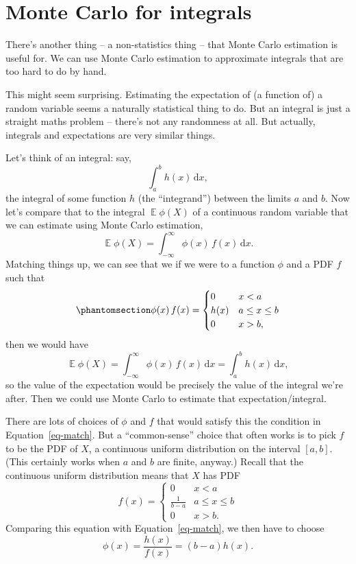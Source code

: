 \documentclass[
  letterpaper,
  DIV=11,
  numbers=noendperiod]{scrreprt}
\newcommand{\Exg}{\operatorname{\mathbb{E}}}
\theoremstyle{plain}
\theoremstyle{definition}
\theoremstyle{definition}
\theoremstyle{remark}
\begin{document}
\section{Monte Carlo for integrals}\label{monte-carlo-for-integrals}

There's another thing -- a non-statistics thing -- that Monte Carlo
estimation is useful for. We can use Monte Carlo estimation to
approximate integrals that are too hard to do by hand.

This might seem surprising. Estimating the expectation of (a function
of) a random variable seems a naturally statistical thing to do. But an
integral is just a straight maths problem -- there's not any randomness
at all. But actually, integrals and expectations are very similar
things.

Let's think of an integral: say, \[ \int_a^b h(x) \,\mathrm{d}x ,\] the
integral of some function \(h\) (the ``integrand'') between the limits
\(a\) and \(b\). Now let's compare that to the integral \(\Exg \phi(X)\)
of a continuous random variable that we can estimate using Monte Carlo
estimation,
\[ \Exg \phi(X) = \int_{-\infty}^\infty \phi(x)\,f(x)\, \mathrm{d} x. \]
Matching things up, we can see that we if we were to a function \(\phi\)
and a PDF \(f\) such that
\begin{equation}\phantomsection\label{eq-match}{ \phi(x)\,f(x) = \begin{cases} 0 & x < a \\ h(x) & a \leq x \leq b \\ 0 & x > b , \end{cases} }\end{equation}
then we would have
\[ \Exg \phi(X) = \int_{-\infty}^\infty \phi(x)\,f(x)\, \mathrm{d} x = \int_a^b h(x) \,\mathrm{d}x, \]
so the value of the expectation would be precisely the value of the
integral we're after. Then we could use Monte Carlo to estimate that
expectation/integral.

There are lots of choices of \(\phi\) and \(f\) that would satisfy this
the condition in Equation~\ref{eq-match}. But a ``common-sense'' choice
that often works is to pick \(f\) to be the PDF of \(X\), a continuous
uniform distribution on the interval \([a,b]\). (This certainly works
when \(a\) and \(b\) are finite, anyway.) Recall that the continuous
uniform distribution means that \(X\) has PDF
\[ f(x) = \begin{cases} 0 & x < a \\ \displaystyle{\frac{1}{b-a}} & a \leq x \leq b \\ 0 & x > b . \end{cases} \]
Comparing this equation with Equation~\ref{eq-match}, we then have to
choose \[\phi(x) = \frac{h(x)}{f(x)} = (b-a)h(x).\]
\end{document}
